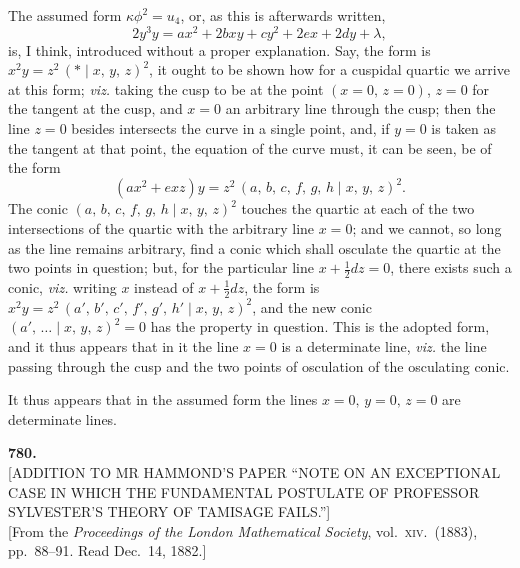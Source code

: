 \documentclass[11pt]{article}
\begin{document}
\noindent
The assumed form $\kappa \phi^{2} = u_{4}$, or, as this is afterwards written,
\[
  2 y^{3} y = a x^{2} + 2 b x y + c y^{2} + 2 e x + 2 d y + \lambda,
\]
is, I think, introduced without a proper explanation. Say, the form is
$x^{2} y = z^{2}\,(*\!\mid\!x,\,y,\,z)^{2}$, it ought to be shown how for a cuspidal quartic
we arrive at this form; \emph{viz.} taking the cusp to be at the point $(x = 0,\,z = 0)$,
$z = 0$ for the tangent at the cusp, and $x = 0$ an arbitrary line through the cusp;
then the line $z = 0$ besides intersects the curve in a single point, and, if $y = 0$
is taken as the tangent at that point, the equation of the curve must, it can be
seen, be of the form
\[
  (ax^{2} + exz) y = z^{2}\,(a,\,b,\,c,\,f,\,g,\,h \mid x,\,y,\,z)^{2}.
\]
The conic $(a,\,b,\,c,\,f,\,g,\,h \mid x,\,y,\,z)^{2}$ touches the quartic at each of the two
intersections of the quartic with the arbitrary line $x = 0$; and we cannot, so long
as the line remains arbitrary, find a conic which shall osculate the quartic at the
two points in question; but, for the particular line $x + \tfrac{1}{2} d z = 0$, there
exists such a conic, \emph{viz.} writing $x$ instead of $x + \tfrac{1}{2} d z$, the form
is $x^{2} y = z^{2}\,(a',\,b',\,c',\,f',\,g',\,h' \mid x,\,y,\,z)^{2}$, and the new conic
$(a',\,\ldots \mid x,\,y,\,z)^{2} = 0$ has the property in question. This is the adopted form,
and it thus appears that in it the line $x = 0$ is a determinate line, \emph{viz.} the line
passing through the cusp and the two points of osculation of the osculating conic.

It thus appears that in the assumed form the lines $x = 0,\,y = 0,\,z = 0$ are determinate
lines.


\bigskip

\begin{center}
\textbf{780.}\\[4pt]
\textsc{[ADDITION TO MR HAMMOND'S PAPER ``NOTE ON AN EXCEPTIONAL CASE IN WHICH THE FUNDAMENTAL POSTULATE OF PROFESSOR SYLVESTER'S THEORY OF TAMISAGE FAILS.'']}\\[4pt]
[From the \textit{Proceedings of the London Mathematical Society}, vol.\ \textsc{xiv}.\ (1883), pp.\ 88--91. Read Dec.\ 14, 1882.]
\end{center}
\end{document}
